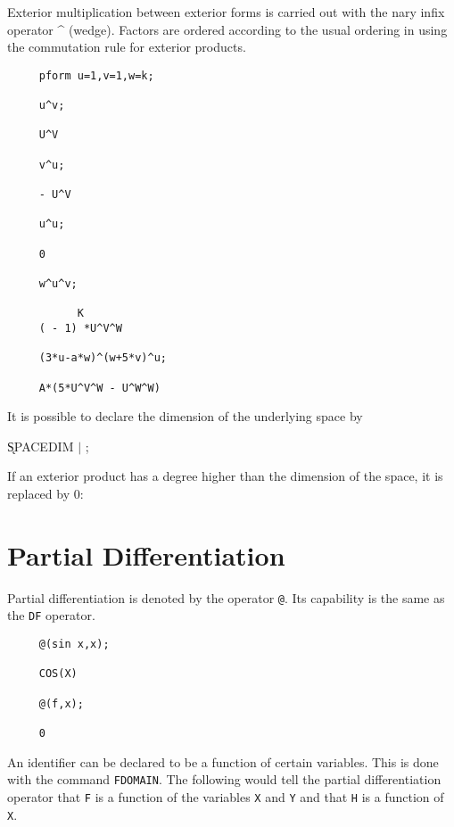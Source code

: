 Exterior multiplication between exterior forms is carried out with the
nary infix operator \^{ } (wedge)\label{wedge}.  Factors are ordered
according to the usual ordering in {\REDUCE} using the commutation
rule for exterior products.
\begin{verbatim}
     pform u=1,v=1,w=k;

     u^v;

     U^V

     v^u;

     - U^V

     u^u;

     0

     w^u^v;

           K
     ( - 1) *U^V^W

     (3*u-a*w)^(w+5*v)^u;

     A*(5*U^V^W - U^W^W)
\end{verbatim}

It is possible to declare the dimension of the underlying space
by\label{SPACEDIM}

\hspace*{2em} \k{SPACEDIM}  $\mid$ ;

If an exterior product has a degree higher than the dimension of the
space, it is replaced by 0:

\section{Partial Differentiation}

Partial differentiation is denoted by the operator {\tt @}\label{at}.
Its capability is the same as the {\REDUCE} {\tt DF} operator.

\example{}

\begin{verbatim}
     @(sin x,x);

     COS(X)

     @(f,x);

     0
\end{verbatim}

An identifier can be declared to be a function of certain variables.
This is done with the command {\tt FDOMAIN}\label{FDOMAIN}.  The
following would tell the partial differentiation operator that {\tt F}
is a function of the variables {\tt X} and {\tt Y} and that {\tt H} is
a function of {\tt X}.


